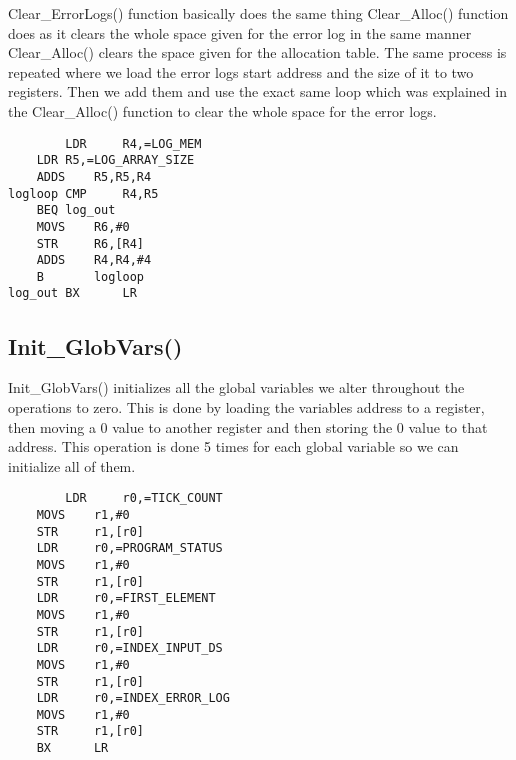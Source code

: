 \documentclass[pdftex,12pt,a4paper]{article}
\begin{document}
Clear\_ErrorLogs() function basically does the same thing Clear\_Alloc() function does as it clears the whole space given for the error log in the same manner Clear\_Alloc() clears the space given for the allocation table. The same process is repeated where we load the error logs start address and the size of it to two registers. Then we add them and use the exact same loop which was explained in the Clear\_Alloc() function to clear the whole space for the error logs. 

\begin{lstlisting}
        LDR     R4,=LOG_MEM					
	LDR	R5,=LOG_ARRAY_SIZE			
	ADDS    R5,R5,R4					
logloop	CMP     R4,R5							
	BEQ	log_out						
	MOVS    R6,#0						
	STR     R6,[R4]						
	ADDS    R4,R4,#4					
	B       logloop						
log_out	BX      LR
\end{lstlisting}

\subsection{Init\_GlobVars()}

Init\_GlobVars() initializes all the global variables we alter throughout the operations to zero. This is done by loading the variables address to a register, then moving a 0 value to another register and then storing the 0 value to that address. This operation is done 5 times for each global variable so we can initialize all of them.

\begin{lstlisting}
        LDR     r0,=TICK_COUNT							
	MOVS    r1,#0								
	STR     r1,[r0]									
	LDR     r0,=PROGRAM_STATUS						
	MOVS    r1,#0								
	STR     r1,[r0]									
	LDR     r0,=FIRST_ELEMENT						
	MOVS    r1,#0									
	STR     r1,[r0]									
	LDR     r0,=INDEX_INPUT_DS						
	MOVS    r1,#0									
	STR     r1,[r0]									
	LDR     r0,=INDEX_ERROR_LOG					
	MOVS    r1,#0								
	STR     r1,[r0]								
	BX      LR	
\end{lstlisting}
\end{document}
